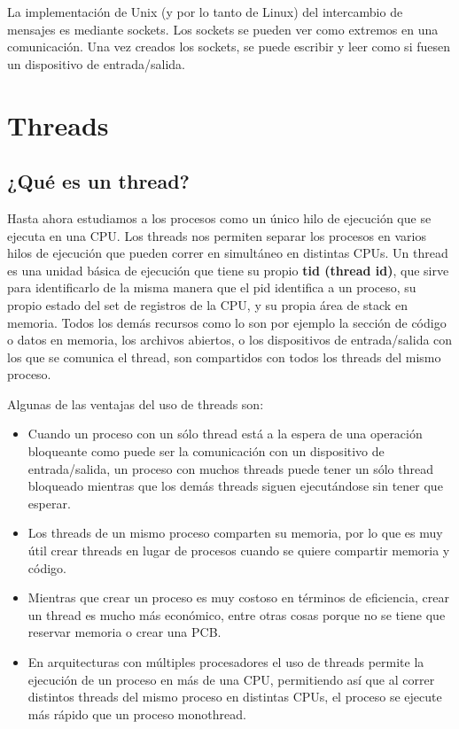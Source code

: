 \documentclass{article}
\begin{document}
La implementaci\'on de Unix (y por lo tanto de Linux) del intercambio de mensajes es mediante sockets. Los sockets se pueden ver como extremos en una comunicaci\'on. Una vez creados los sockets, se puede escribir y leer como si fuesen un dispositivo de entrada/salida.

\section{Threads}

\subsection{¿Qu\'e es un thread?}

Hasta ahora estudiamos a los procesos como un \'unico hilo de ejecuci\'on que se ejecuta en una CPU. Los threads nos permiten separar los procesos en varios hilos de ejecuci\'on que pueden correr en simult\'aneo en distintas CPUs. Un thread es una unidad b\'asica de ejecuci\'on que tiene su propio \textbf{tid (thread id)}, que sirve para identificarlo de la misma manera que el pid identifica a un proceso, su propio estado del set de registros de la CPU, y su propia \'area de stack en memoria. Todos los dem\'as recursos como lo son por ejemplo la secci\'on de c\'odigo o datos en memoria, los archivos abiertos, o los dispositivos de entrada/salida con los que se comunica el thread, son compartidos con todos los threads del mismo proceso.

Algunas de las ventajas del uso de threads son:

\begin{itemize}
\item Cuando un proceso con un s\'olo thread est\'a a la espera de una operaci\'on bloqueante como puede ser la comunicaci\'on con un dispositivo de entrada/salida, un proceso con muchos threads puede tener un s\'olo thread bloqueado mientras que los dem\'as threads siguen ejecut\'andose sin tener que esperar.
\item Los threads de un mismo proceso comparten su memoria, por lo que es muy \'util crear threads en lugar de procesos cuando se quiere compartir memoria y c\'odigo.
\item Mientras que crear un proceso es muy costoso en t\'erminos de eficiencia, crear un thread es mucho m\'as econ\'omico, entre otras cosas porque no se tiene que reservar memoria o crear una PCB.
\item En arquitecturas con m\'ultiples procesadores el uso de threads permite la ejecuci\'on de un proceso en m\'as de una CPU, permitiendo as\'i que al correr distintos threads del mismo proceso en distintas CPUs, el proceso se ejecute m\'as r\'apido que un proceso monothread.
\end{itemize}
\end{document}
